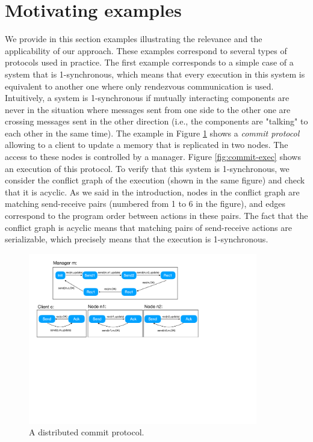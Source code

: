 \section{Motivating examples}

%
%
%
%
%
%

We provide in this section examples illustrating the relevance and the applicability of our approach. These examples correspond to several types of protocols used in practice. The first example corresponds to a simple case of a system that is 1-synchronous, which means that every execution in this system is equivalent to another one where only rendezvous communication is used. Intuitively, a system is 1-synchronous if mutually interacting components are never in the situation where messages sent from one side to the other one are crossing messages sent in the other direction (i.e., the components are "talking" to each other in the same time). The example in Figure \ref{fig:commit} shows a {\em commit protocol} allowing to a client to update a memory that is replicated in two nodes. The access to these nodes is controlled by a manager. Figure \ref{fig:commit-exec} shows an execution of this protocol. To verify that this system is 1-synchronous, we consider the conflict graph of the execution (shown in the same figure) and check that it is acyclic. As we said in the introduction, nodes in the conflict graph are matching send-receive pairs (numbered from 1 to 6 in the figure), and edges correspond to the program order between actions in these pairs. The fact that the conflict graph is acyclic means that matching pairs of send-receive actions are serializable, which precisely means that the execution is 1-synchronous. 

\begin{figure}[t]
\includegraphics[width=10cm]{commit.pdf}
\caption{A distributed commit protocol.}
\label{fig:commit}
\end{figure}

